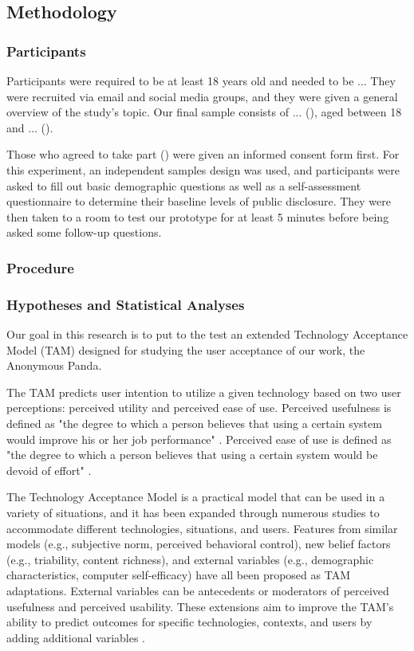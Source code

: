 \subsection{Methodology}


\subsubsection{Participants}
Participants were required to be at least 18 years old and needed to be ... They were recruited via email and social media groups, and they were given a general overview of the study's topic. Our final sample consists of ... (), aged between 18 and ... ().

Those who agreed to take part () were given an informed consent form first. For this experiment, an independent samples design was used, and participants were asked to fill out basic demographic questions as well as a self-assessment questionnaire to determine their baseline levels of public disclosure. They were then taken to a room to test our prototype for at least 5 minutes before being asked some follow-up questions.

\subsubsection{Procedure}


\subsubsection{Hypotheses and Statistical Analyses}
Our goal in this research is to put to the test an extended Technology Acceptance Model (TAM) designed for studying the user acceptance of our work, the Anonymous Panda.

The TAM predicts user intention to utilize a given technology based on two user perceptions: perceived utility and perceived ease of use. Perceived usefulness is defined as "the degree to which a person believes that using a certain system would improve his or her job performance" \cite{DAV89}. Perceived ease of use is defined as "the degree to which a person believes that using a certain system would be devoid of effort" \cite{DAV89}.

The Technology Acceptance Model is a practical model that can be used in a variety of situations, and it has been expanded through numerous studies to accommodate different technologies, situations, and users. Features from similar models (e.g., subjective norm, perceived behavioral control), new belief factors (e.g., triability, content richness), and external variables (e.g., demographic characteristics, computer self-efficacy) have all been proposed as TAM adaptations. External variables can be antecedents or moderators of perceived usefulness and perceived usability. These extensions aim to improve the TAM's ability to predict outcomes for specific technologies, contexts, and users by adding additional variables \cite{CAM20}.

